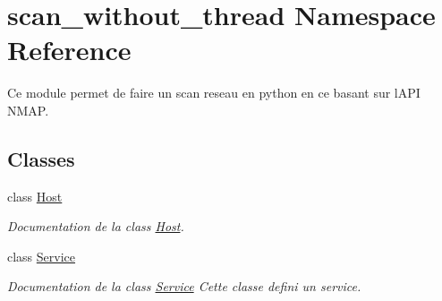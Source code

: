 \hypertarget{namespacescan__without__thread}{}\section{scan\+\_\+without\+\_\+thread Namespace Reference}
\label{namespacescan__without__thread}


Ce module permet de faire un scan reseau en python en ce basant sur l\textquotesingle{}A\+PI N\+M\+AP.  


\subsection*{Classes}
\begin{DoxyCompactItemize}
\item 
class \hyperlink{classscan__without__thread_1_1Host}{Host}
\begin{DoxyCompactList}\small\item\em Documentation de la class \hyperlink{classscan__without__thread_1_1Host}{Host}. \end{DoxyCompactList}\item 
class \hyperlink{classscan__without__thread_1_1Service}{Service}
\begin{DoxyCompactList}\small\item\em Documentation de la class \hyperlink{classscan__without__thread_1_1Service}{Service} Cette classe defini un service. \end{DoxyCompactList}\end{DoxyCompactItemize}
